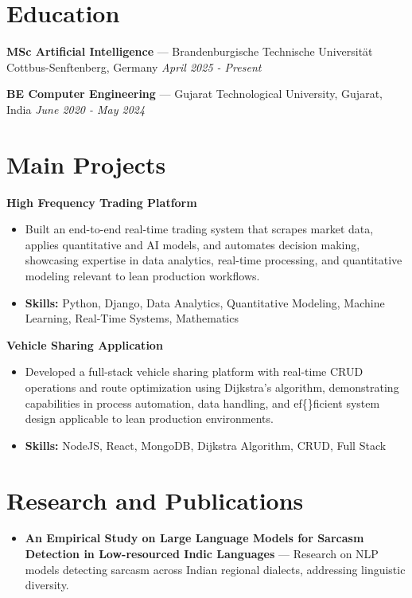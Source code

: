 \documentclass[a4paper,10pt]{article}
\begin{document}
\section*{Education}
\textbf{MSc Artificial Intelligence} — Brandenburgische Technische Universität Cottbus-Senftenberg, Germany \hfill \textit{April 2025 - Present}\par
\vspace{1.5pt}
\textbf{BE Computer Engineering} — Gujarat Technological University, Gujarat, India \hfill \textit{June 2020 - May 2024}\par

\section*{Main Projects}
\textbf{High Frequency Trading Platform}\par
\vspace{1pt}
\begin{itemize}
  \item Built an end-to-end real-time trading system that scrapes market data, applies quantitative and AI models, and automates decision making, showcasing expertise in data analytics, real-time processing, and quantitative modeling relevant to lean production workflows.
  \item \textbf{Skills:} Python, Django, Data Analytics, Quantitative Modeling, Machine Learning, Real-Time Systems, Mathematics
\end{itemize}
\vspace{3pt}
\textbf{Vehicle Sharing Application}\par
\vspace{1pt}
\begin{itemize}
  \item Developed a full-stack vehicle sharing platform with real-time CRUD operations and route optimization using Dijkstra's algorithm, demonstrating capabilities in process automation, data handling, and ef\{\}ficient system design applicable to lean production environments.
  \item \textbf{Skills:} NodeJS, React, MongoDB, Dijkstra Algorithm, CRUD, Full Stack
\end{itemize}

\section*{Research and Publications}
\begin{itemize}
\item \textbf{An Empirical Study on Large Language Models for Sarcasm Detection in Low-resourced Indic Languages} — Research on NLP models detecting sarcasm across Indian regional dialects, addressing linguistic diversity.
\end{itemize}
\end{document}
